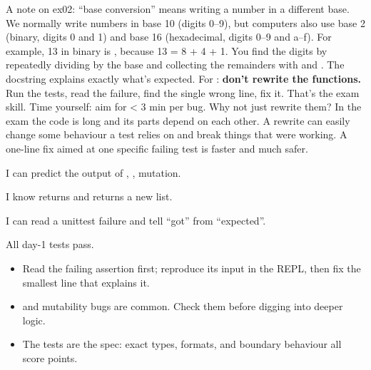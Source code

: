 \documentclass[10pt,a4paper]{article}
\begin{document}
A note on ex02: “base conversion” means writing a number in a different base. We normally write numbers in base 10 (digits 0–9), but computers also use base 2 (binary, digits 0 and 1) and base 16 (hexadecimal, digits 0–9 and a–f). For example, 13 in binary is , because 13 = 8 + 4 + 1. You find the digits by repeatedly dividing by the base and collecting the remainders with \code{\%} and \code{/\allowbreak{}/\allowbreak{}}. The docstring explains exactly what’s expected.
For : \textbf{don’t rewrite the functions.} Run the tests, read the failure, find the single wrong line, fix it. That’s the exam skill. Time yourself: aim for \textless{} 3 min per bug.
Why not just rewrite them? In the exam the code is long and its parts depend on each other. A rewrite can easily change some behaviour a test relies on and break things that were working. A one-line fix aimed at one specific failing test is faster and much safer.
\begin{checklistbox}
\begin{checklist}
\item I can predict the output of , ,  mutation.
\item I know  returns  and  returns a new list.
\item I can read a unittest failure and tell “got” from “expected”.
\item All day-1 tests pass.
\end{checklist}
\scoreline
\end{checklistbox}
\begin{examlensbox}
\begin{itemize}
\item Read the failing assertion first; reproduce its input in the REPL, then fix the smallest line that explains it.
\item {} and mutability bugs are common. Check them before digging into deeper logic.
\item The tests are the spec: exact types, formats, and boundary behaviour all score points.
\end{itemize}
\end{examlensbox}
\bugjournalifspace
\end{document}
